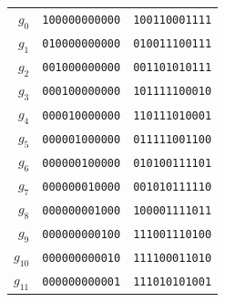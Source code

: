 \begin{tabular}{@{}r@{\;\;}c@{\;\;}c@{}}
$g_{0}$ & \texttt{100000000000} & \texttt{100110001111} \\
$g_{1}$ & \texttt{010000000000} & \texttt{010011100111} \\
$g_{2}$ & \texttt{001000000000} & \texttt{001101010111} \\
$g_{3}$ & \texttt{000100000000} & \texttt{101111100010} \\
$g_{4}$ & \texttt{000010000000} & \texttt{110111010001} \\
$g_{5}$ & \texttt{000001000000} & \texttt{011111001100} \\
$g_{6}$ & \texttt{000000100000} & \texttt{010100111101} \\
$g_{7}$ & \texttt{000000010000} & \texttt{001010111110} \\
$g_{8}$ & \texttt{000000001000} & \texttt{100001111011} \\
$g_{9}$ & \texttt{000000000100} & \texttt{111001110100} \\
$g_{10}$ & \texttt{000000000010} & \texttt{111100011010} \\
$g_{11}$ & \texttt{000000000001} & \texttt{111010101001} \\
\end{tabular}

